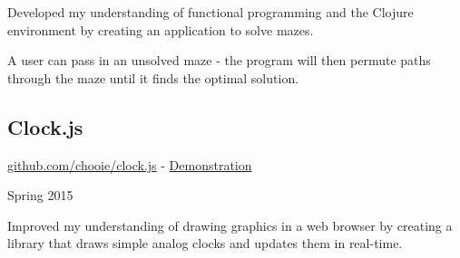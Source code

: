 Developed my understanding of functional programming and the Clojure environment
by creating an application to solve mazes.

A user can pass in an unsolved maze - the program will then permute paths
through the maze until it finds the optimal solution.

\subsection*{Clock.js}
\noindent\begin{minipage}[b]{0.8\textwidth}
  \flushleft
  \href{https://github.com/chooie/clock.js} {github.com/chooie/clock.js} -
  \href {https://chooie.github.io/clock.js} {Demonstration}
\end{minipage}
\noindent\begin{minipage}[b]{0.2\textwidth}
  \flushright
  Spring 2015
\end{minipage}

Improved my understanding of drawing graphics in a web browser by creating a
library that draws simple analog clocks and updates them in real-time.

